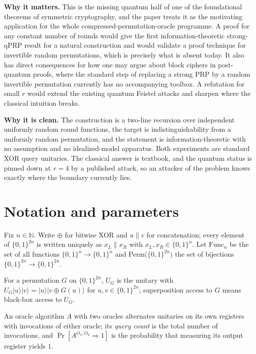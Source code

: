 \documentclass{aicr-conjecture}
\newcommand{\ket}[1]{|#1\rangle}
\newcommand{\bits}{\{0,1\}}
\newcommand{\NN}{\mathbb{N}}
\newcommand{\Func}{\mathrm{Func}}
\newcommand{\Perm}{\mathrm{Perm}}
\begin{document}
\textbf{Why it matters.} This is the missing quantum half of one of
the foundational theorems of symmetric cryptography, and the paper
treats it as the motivating application for the whole
compressed-permutation-oracle programme. A proof for any constant
number of rounds would give the first information-theoretic
strong-qPRP result for a natural construction and would validate a
proof technique for invertible random permutations, which is precisely
what is absent today. It also has direct consequences for how one may
argue about block ciphers in post-quantum proofs, where the standard
step of replacing a strong PRP by a random invertible permutation
currently has no accompanying toolbox. A refutation for small $r$
would extend the existing quantum Feistel attacks and sharpen where
the classical intuition breaks.

\textbf{Why it is clean.} The construction is a two-line recursion
over independent uniformly random round functions, the target is
indistinguishability from a uniformly random permutation, and the
statement is information-theoretic with no assumption and no
idealized-model apparatus. Both experiments are standard XOR query
unitaries. The classical answer is textbook, and the quantum status is
pinned down at $r = 4$ by a published attack, so an attacker of the
problem knows exactly where the boundary currently lies.

\section{Notation and parameters}\label{sec:notation}

Fix $n \in \NN$. Write $\oplus$ for bitwise XOR and $u \| v$ for
concatenation; every element of $\bits^{2n}$ is written uniquely as
$x_L \| x_R$ with $x_L, x_R \in \bits^n$. Let $\Func_n$ be the set of
all functions $\bits^n \to \bits^n$ and $\Perm\bigl(\bits^{2n}\bigr)$
the set of bijections $\bits^{2n} \to \bits^{2n}$.

For a permutation $G$ on $\bits^{2n}$, $U_G$ is the unitary with
$U_G \ket{u} \ket{v} = \ket{u} \ket{v \oplus G(u)}$ for
$u, v \in \bits^{2n}$; superposition access to $G$ means black-box
access to $U_G$.

An oracle algorithm $A$ with two oracles alternates unitaries on its
own registers with invocations of either oracle; its \emph{query
count} is the total number of invocations, and
$\Pr[A^{O_1,O_2} \Rightarrow 1]$ is the probability that measuring its
output register yields $1$.
\end{document}
